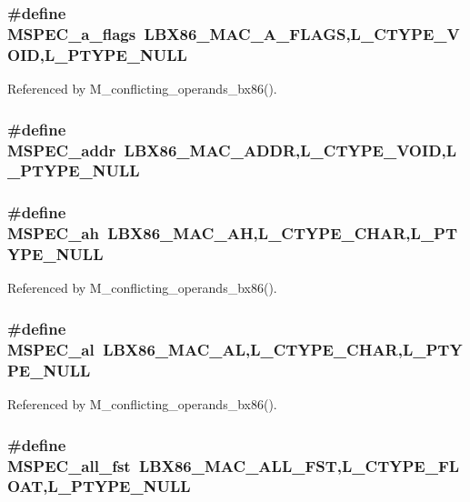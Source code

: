 \subsubsection{\setlength{\rightskip}{0pt plus 5cm}\#define MSPEC\_\-a\_\-flags~LBX86\_\-MAC\_\-A\_\-FLAGS,L\_\-CTYPE\_\-VOID,L\_\-PTYPE\_\-NULL}\label{ml__bx86_8c_599048f42550be1cbe587284c2886ec1}




Referenced by M\_\-conflicting\_\-operands\_\-bx86().
\subsubsection{\setlength{\rightskip}{0pt plus 5cm}\#define MSPEC\_\-addr~LBX86\_\-MAC\_\-ADDR,L\_\-CTYPE\_\-VOID,L\_\-PTYPE\_\-NULL}\label{ml__bx86_8c_9e2940dc528a9c215abe1274371caa41}


\subsubsection{\setlength{\rightskip}{0pt plus 5cm}\#define MSPEC\_\-ah~LBX86\_\-MAC\_\-AH,L\_\-CTYPE\_\-CHAR,L\_\-PTYPE\_\-NULL}\label{ml__bx86_8c_559407de736693c518238ad0c3b5daa3}




Referenced by M\_\-conflicting\_\-operands\_\-bx86().
\subsubsection{\setlength{\rightskip}{0pt plus 5cm}\#define MSPEC\_\-al~LBX86\_\-MAC\_\-AL,L\_\-CTYPE\_\-CHAR,L\_\-PTYPE\_\-NULL}\label{ml__bx86_8c_f8354adbcb40deeb57da02b510b920f0}




Referenced by M\_\-conflicting\_\-operands\_\-bx86().
\subsubsection{\setlength{\rightskip}{0pt plus 5cm}\#define MSPEC\_\-all\_\-fst~LBX86\_\-MAC\_\-ALL\_\-FST,L\_\-CTYPE\_\-FLOAT,L\_\-PTYPE\_\-NULL}\label{ml__bx86_8c_afeef3c7bfa8b5cadd05e2743f839020}




